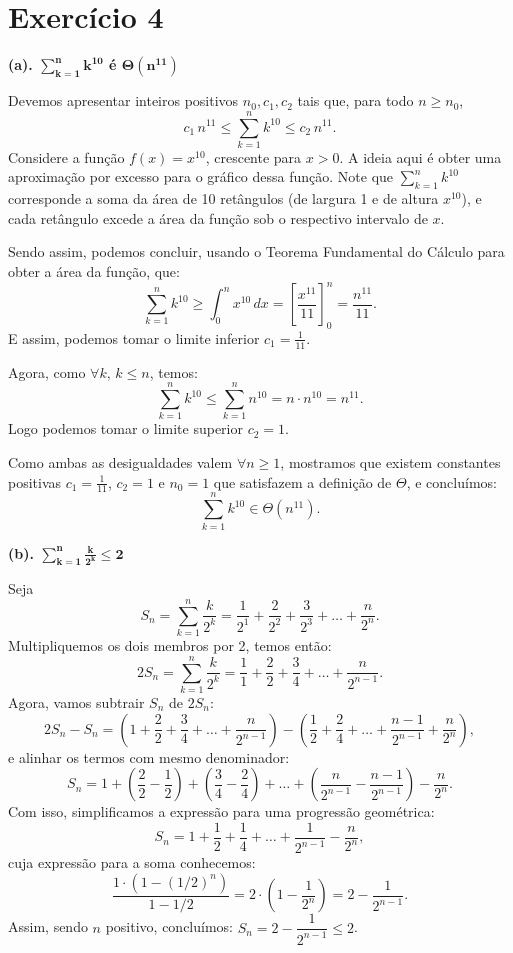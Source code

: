 \documentclass[a4paper]{article}
\begin{document}
\bigskip

\newpage

\section*{Exercício 4}

\textbf{(a). $\bm{\sum_{k=1}^{n} k^{10}}$ é $\bm{\Theta(n^{11})}$}

Devemos apresentar inteiros positivos \(n_0, c_1,c_2\) tais que, para todo \(n\ge n_0\),
\[ c_1 \, n^{11} \le \sum_{k=1}^n k^{10} \le c_2 \, n^{11}. \]
Considere a função \(f(x)=x^{10}\), crescente para $x>0$. A ideia aqui é obter uma aproximação por excesso para o gráfico dessa função. Note que $\sum_{k=1}^n k^{10}$ corresponde a soma da área de 10 retângulos (de largura 1 e de altura $x^{10}$), e cada retângulo excede a área da função sob o respectivo intervalo de $x$.

Sendo assim, podemos concluir, usando o Teorema Fundamental do Cálculo para obter a área da função, que:
\[ \sum_{k=1}^n k^{10} \ge \int_{0}^{n} x^{10}\,dx = \left[\frac{x^{11}}{11}\right]_{0}^{n} = \frac{n^{11}}{11}. \]
E assim, podemos tomar o limite inferior \(c_1=\frac{1}{11}\).

Agora, como $\forall k, \, k \le n$, temos:
\[ \sum_{k=1}^n k^{10} \le \sum_{k=1}^n n^{10} = n\cdot n^{10}=n^{11}. \]
Logo podemos tomar o limite superior \(c_2=1\).

Como ambas as desigualdades valem $\forall n \ge 1$, mostramos que existem constantes positivas \(c_1=\frac{1}{11}\), \(c_2=1\) e \(n_0=1\) que satisfazem a definição de \(\Theta\), e concluímos:
\[ \sum_{k=1}^n k^{10} \in \Theta(n^{11}). \]

\bigskip

\textbf{(b). $\bm{\sum_{k=1}^n \frac{k}{2^k} \le 2}$}

Seja
\[ S_{n}=\sum _{k=1}^{n}\frac{k}{2^{k}}=\frac{1}{2^{1}}+\frac{2}{2^{2}}+\frac{3}{2^{3}}+\dots +\frac{n}{2^{n}}. \]
Multipliquemos os dois membros por 2, temos então:
\[ 2S_{n}=\sum _{k=1}^{n}\frac{k}{2^{k}}=\frac 11+\frac 22+\frac 34+\dots +\frac{n}{2^{n-1}}. \]
Agora, vamos subtrair $S_n$ de $2S_n$:
\[ 2S_{n}-S_{n}=\left(1+\frac{2}{2}+\frac{3}{4}+\dots +\frac{n}{2^{n-1}}\right)-\left(\frac{1}{2}+\frac{2}{4}+\dots +\frac{n-1}{2^{n-1}}+\frac{n}{2^{n}}\right), \]
e alinhar os termos com mesmo denominador:
\[ S_{n}=1+\left(\frac{2}{2}-\frac{1}{2}\right)+\left(\frac{3}{4}-\frac{2}{4}\right)+\dots +\left(\frac{n}{2^{n-1}}-\frac{n-1}{2^{n-1}}\right)-\frac{n}{2^{n}}. \]
Com isso, simplificamos a expressão para uma progressão geométrica:
\[ S_{n}=1+\frac{1}{2}+\frac{1}{4}+\dots +\frac{1}{2^{n-1}}-\frac{n}{2^{n}}, \]
cuja expressão para a soma conhecemos:
\[ \frac{1 \cdot (1-(1/2)^{n})}{1-1/2}=2 \cdot (1-\frac{1}{2^{n}})=2-\frac{1}{2^{n-1}}.\]
Assim, sendo $n$ positivo, concluímos: $S_n = 2 - \dfrac 1{2^{n-1}} \le 2$.
\end{document}
